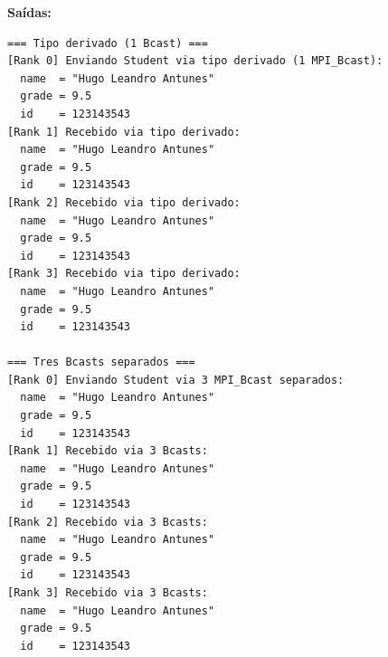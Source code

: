 \documentclass[10pt,small,a4paper]{article}
\begin{document}
\textbf{Saídas:}
\begin{lstlisting}[language={},numbers=none]
=== Tipo derivado (1 Bcast) ===
[Rank 0] Enviando Student via tipo derivado (1 MPI_Bcast):
  name  = "Hugo Leandro Antunes"
  grade = 9.5
  id    = 123143543
[Rank 1] Recebido via tipo derivado:
  name  = "Hugo Leandro Antunes"
  grade = 9.5
  id    = 123143543
[Rank 2] Recebido via tipo derivado:
  name  = "Hugo Leandro Antunes"
  grade = 9.5
  id    = 123143543
[Rank 3] Recebido via tipo derivado:
  name  = "Hugo Leandro Antunes"
  grade = 9.5
  id    = 123143543

=== Tres Bcasts separados ===
[Rank 0] Enviando Student via 3 MPI_Bcast separados:
  name  = "Hugo Leandro Antunes"
  grade = 9.5
  id    = 123143543
[Rank 1] Recebido via 3 Bcasts:
  name  = "Hugo Leandro Antunes"
  grade = 9.5
  id    = 123143543
[Rank 2] Recebido via 3 Bcasts:
  name  = "Hugo Leandro Antunes"
  grade = 9.5
  id    = 123143543
[Rank 3] Recebido via 3 Bcasts:
  name  = "Hugo Leandro Antunes"
  grade = 9.5
  id    = 123143543
\end{lstlisting}
\end{document}
